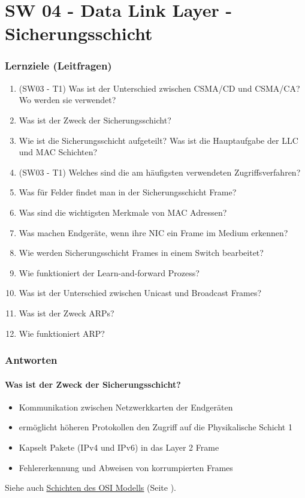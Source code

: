 \part{SW 04 - Data Link Layer - Sicherungsschicht}\label{part:sw04}
\section{Lernziele (Leitfragen)}
\begin{enumerate}
    \item (SW03 - T1) Was ist der Unterschied zwischen CSMA/CD und CSMA/CA? Wo werden sie verwendet?
    \item Was ist der Zweck der Sicherungsschicht?
    \item Wie ist die Sicherungsschicht aufgeteilt? Was ist die Hauptaufgabe der LLC und MAC Schichten?
    \item (SW03 - T1) Welches sind die am häufigsten verwendeten Zugriffsverfahren?
    \item Was für Felder findet man in der Sicherungsschicht Frame?
    \item Was sind die wichtigsten Merkmale von MAC Adressen?
    \item Was machen Endgeräte, wenn ihre NIC ein Frame im Medium erkennen?
    \item Wie werden Sicherungsschicht Frames in einem Switch bearbeitet?
    \item Wie funktioniert der \flqq Learn-and-forward\frqq{} Prozess?
    \item Was ist der Unterschied zwischen \flqq Unicast\frqq{} und \flqq Broadcast\frqq{} Frames?
    \item Was ist der Zweck ARPs?
    \item Wie funktioniert ARP?
\end{enumerate}

\section{Antworten}
\subsection*{Was ist der Zweck der Sicherungsschicht?}\label{sub:Sicherungsschicht}
\begin{itemize}
    \item Kommunikation zwischen Netzwerkkarten der Endgeräten
    \item ermöglicht höheren Protokollen den Zugriff auf die Physikalische Schicht 1
    \item Kapselt Pakete (IPv4 und IPv6) in das Layer 2 Frame
    \item Fehlererkennung und Abweisen von korrumpierten Frames
\end{itemize}
Siehe auch \underline{\hyperref[sub:SchichtenOSIModell]{Schichten des OSI Modells}} (Seite \pageref{sub:SchichtenOSIModell}).

